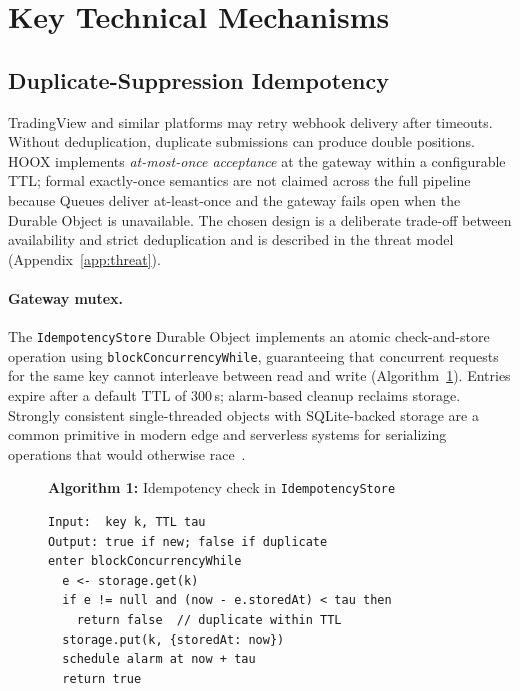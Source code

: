 \section{Key Technical Mechanisms}
\label{sec:mechanisms}

\subsection{Duplicate-Suppression Idempotency}

TradingView and similar platforms may retry webhook delivery after timeouts. Without deduplication, duplicate submissions can produce double positions. \textsc{HOOX} implements \emph{at-most-once acceptance} at the gateway within a configurable TTL; formal exactly-once semantics are not claimed across the full pipeline because Queues deliver at-least-once and the gateway fails open when the Durable Object is unavailable. The chosen design is a deliberate trade-off between availability and strict deduplication and is described in the threat model (Appendix~\ref{app:threat}).

\paragraph{Gateway mutex.} The \texttt{IdempotencyStore} Durable Object implements an atomic check-and-store operation using \texttt{blockConcurrencyWhile}, guaranteeing that concurrent requests for the same key cannot interleave between read and write (Algorithm~\ref{alg:idempotency}). Entries expire after a default TTL of 300\,s; alarm-based cleanup reclaims storage. Strongly consistent single-threaded objects with SQLite-backed storage are a common primitive in modern edge and serverless systems for serializing operations that would otherwise race~\cite{cloudflare-durable-objects,shahrad2020serverless}.

\begin{figure}[!htbp]
  \centering
  \begin{minipage}{0.92\linewidth}
  \textbf{Algorithm 1:} Idempotency check in \texttt{IdempotencyStore}
  \label{alg:idempotency}
  \small
  \begin{lstlisting}
Input:  key k, TTL tau
Output: true if new; false if duplicate
enter blockConcurrencyWhile
  e <- storage.get(k)
  if e != null and (now - e.storedAt) < tau then
    return false  // duplicate within TTL
  storage.put(k, {storedAt: now})
  schedule alarm at now + tau
  return true
  \end{lstlisting}
  \end{minipage}
\end{figure}

